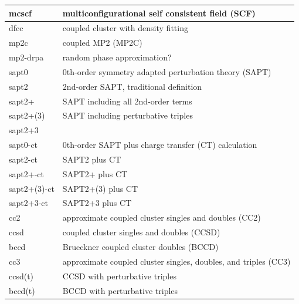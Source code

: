 \documentclass[letterpaper,10pt,english]{sphinxmanual}
\begin{document}
\begin{fulllineitems}
\begin{longtable}{|l|l|}
mcscf
 & 
multiconfigurational self consistent field (SCF)
\\\hline

dfcc
 & 
coupled cluster with density fitting
\\\hline

mp2c
 & 
coupled MP2 (MP2C)
\\\hline

mp2-drpa
 & 
random phase approximation?
\\\hline

sapt0
 & 
0th-order symmetry adapted perturbation theory (SAPT)
\\\hline

sapt2
 & 
2nd-order SAPT, traditional definition
\\\hline

sapt2+
 & 
SAPT including all 2nd-order terms
\\\hline

sapt2+(3)
 & 
SAPT including perturbative triples
\\\hline

sapt2+3
 & \\\hline

sapt0-ct
 & 
0th-order SAPT plus charge transfer (CT) calculation
\\\hline

sapt2-ct
 & 
SAPT2 plus CT
\\\hline

sapt2+-ct
 & 
SAPT2+ plus CT
\\\hline

sapt2+(3)-ct
 & 
SAPT2+(3) plus CT
\\\hline

sapt2+3-ct
 & 
SAPT2+3 plus CT
\\\hline

cc2
 & 
approximate coupled cluster singles and doubles (CC2)
\\\hline

ccsd
 & 
coupled cluster singles and doubles (CCSD)
\\\hline

bccd
 & 
Brueckner coupled cluster doubles (BCCD)
\\\hline

cc3
 & 
approximate coupled cluster singles, doubles, and triples (CC3)
\\\hline

ccsd(t)
 & 
CCSD with perturbative triples
\\\hline

bccd(t)
 & 
BCCD with perturbative triples
\\\hline


\end{longtable}
\end{fulllineitems}
\end{document}

